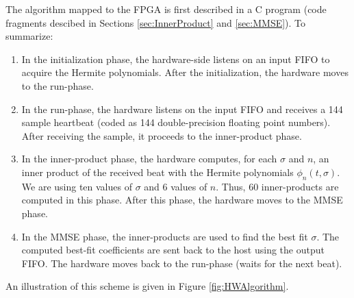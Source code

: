 \documentclass[runningheads]{llncs}
\begin{document}
The algorithm mapped to the FPGA 
is first described in a C program (code fragments descibed in Sections \ref{sec:InnerProduct} and \ref{sec:MMSE}).
To summarize:
\begin{enumerate}
\item In the initialization phase, the hardware-side listens on an input FIFO to acquire
the Hermite polynomials.  After the initialization, the hardware moves to the run-phase.
\item In the run-phase, the hardware listens on the input FIFO and receives a 144 sample
heartbeat (coded as 144 double-precision floating point numbers).  After receiving
the sample, it proceeds to the inner-product phase.
\item In the inner-product phase, the hardware computes, for each $\sigma$ and
$n$, an inner product of the received beat with the Hermite polynomials $\phi_n(t,\sigma)$.
We are using ten values of $\sigma$ and $6$ values of $n$.  Thus, 60 inner-products
are computed in this phase.  After this phase, the hardware moves to the MMSE
phase.
\item  In the MMSE phase, the inner-products are used to find the best fit $\sigma$.
The computed best-fit coefficients are sent back to the host using the output FIFO.
The hardware moves back to the run-phase (waits for the next beat).
\end{enumerate}
An illustration of this scheme is given in Figure \ref{fig:HWAlgorithm}.
\end{document}
